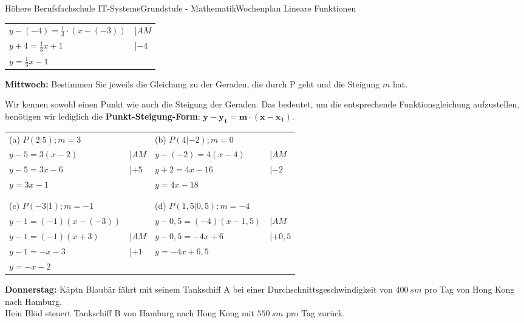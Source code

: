 \documentclass[oneside,openany,headings=optiontotoc,11pt,numbers=noenddot]{scrreprt}
\begin{document}
\begin{worksheet}{Höhere Berufsfachschule IT-Systeme}{Grundstufe - Mathematik}{Wochenplan Lineare Funktionen}
\begin{framed}
			\par\noindent
			\begin{tabularx}{\textwidth}{ll}
				\(y - (-4) = \frac{1}{3}\cdot(x-(-3))\) & |\(AM\)\\
				\(y + 4 = \frac{1}{3}x + 1\) & |\(-4\)\\
				\colorbox{green!10}{\(y = \frac{1}{3}x -1\)}
			\end{tabularx}
		\end{framed}
		\begin{framed}
			\noindent
			\textbf{Mittwoch:} Bestimmen Sie jeweils die Gleichung zu der Geraden, die durch P geht und die Steigung \(m\) hat.
			\begin{framed}
				\noindent
				Wir kennen sowohl einen Punkt wie auch die Steigung der Geraden. Das bedeutet, um die entsprechende Funktionsgleichung aufzustellen, benötigen wir lediglich die \textbf{Punkt-Steigung-Form}: \(\mathbf{y -y_1 = m\cdot(x-x_1)}\).
			\end{framed}
			\begin{tabularx}{\textwidth}{Xl|Xl}
				(a) \(P(2|5); m=3\) & & (b) \(P(4|-2); m=0\)\\
				\(y - 5 = 3(x-2)\) & |\(AM\) & \(y-(-2) = 4(x-4)\) & |\(AM\)\\
				\(y - 5 = 3x -6\) & |\(+5\) & \(y+2 = 4x -16\) & |\(-2\)\\
				\colorbox{green!10}{\(y= 3x - 1\)} & & \colorbox{green!10}{\(y = 4x - 18\)}\\
				\\
				\hline
				\\
				(c) \(P(-3|1); m=-1\) & & (d) \(P(1,5|0,5); m=-4\)\\
				\(y - 1 = (-1)(x-(-3))\) &  & \( y-0,5 = (-4)(x-1,5)\) & |\(AM\)\\
				\(y -1 = (-1)(x+3)\) & |\(AM\) & \( y-0,5 = -4x +6\) & |\(+0,5\)\\
				\(y - 1 = -x -3\) & |\(+1\) & \colorbox{green!10}{\(y = -4x +6,5\)}\\
				\colorbox{green!10}{\(y = -x -2\)} & & 
			\end{tabularx}
		\end{framed}
		\begin{framed}
			\noindent
			\textbf{Donnerstag:} Käpt\grq{}n Blaubär fährt mit seinem Tankschiff A bei einer Durchschnittsgeschwindigkeit von \(400\ sm\) pro Tag von Hong Kong nach Hamburg.\\
			Hein Blöd steuert Tankschiff B von Hamburg nach Hong Kong mit \(550\ sm\) pro Tag zurück.
			\begin{itemize}

\end{itemize}
\end{framed}
\end{worksheet}
\end{document}

